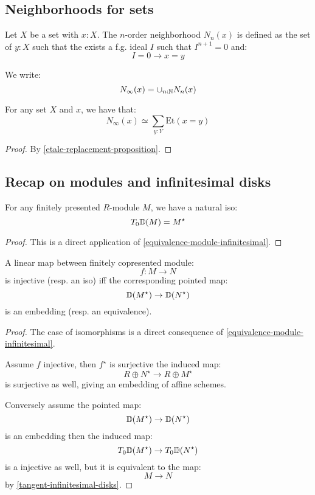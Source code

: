 \subsection{Neighborhoods for sets}

\begin{definition}
Let $X$ be a set with $x:X$. The $n$-order neighborhood $N_n(x)$ is defined as the set of $y:X$ such that the exists a f.g. ideal $I$ such that $I^{n+1}=0$ and:
\[I=0 \to x=y\]
\end{definition}

We write:
\[N_\infty(x) = \cup_{n:\mathbb{N}} N_n(x)\]

\begin{lemma}
For any set $X$ and $x$, we have that:
\[N_\infty(x) \simeq \sum_{y:Y} \mathrm{Et}(x=y)\]
\end{lemma}

\begin{proof}
By \cref{etale-replacement-proposition}.
\end{proof}


\subsection{Recap on modules and infinitesimal disks}

\begin{lemma}\label{tangent-infinitesimal-disks}
For any finitely presented $R$-module $M$, we have a natural iso:
\[T_0\mathbb{D}(M) = M^\star\]
\end{lemma}

\begin{proof}
This is a direct application of \cref{equivalence-module-infinitesimal}.
\end{proof}

\begin{lemma}\label{neighborhood-tangent-correspondence}
A linear map between finitely copresented module:
\[f:M\to N\]
is injective (resp. an iso) iff the corresponding pointed map:
\[\mathbb{D}(M^\star) \to \mathbb{D}(N^\star)\]
is an embedding (resp. an equivalence).
\end{lemma}

\begin{proof}
The case of isomorphisms is a direct consequence of \cref{equivalence-module-infinitesimal}.

Assume $f$ injective, then $f^\star$ is surjective the induced map:
\[R\oplus N^\star \to R\oplus M^\star\]
is surjective as well, giving an embedding of affine schemes. 

Conversely assume the pointed map:
\[\mathbb{D}(M^\star) \to \mathbb{D}(N^\star)\]
is an embedding then the induced map:
\[T_0\mathbb{D}(M^\star) \to T_0\mathbb{D}(N^\star)\]
is a injective as well, but it is equivalent to the map:
\[M\to N\]
by \cref{tangent-infinitesimal-disks}.
\end{proof}

